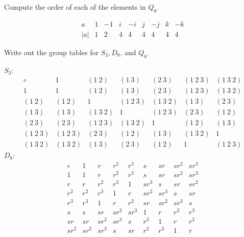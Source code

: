 \begin{problems}
    \item Compute the order of each of the elements in $Q_8$.
    \begin{sol}
        \[\begin{array}{c|c|c|c|c|c|c|c|c}
            a & 1 & -1 & i & -i & j & -j & k & -k \\
            \hline
            |a| & 1 & 2 & 4 & 4 & 4 & 4 & 4 & 4
        \end{array}\]
    \end{sol}
    \item Write out the group tables for $S_3, D_8$, and $Q_8$.
    \begin{sol}
        $S_3$:
        \[\begin{array}{c|c|c|c|c|c|c}
            \circ & 1 & (1\ 2) & (1\ 3) & (2\ 3) & (1\ 2\ 3) & (1\ 3\ 2) \\
            \hline
            1 & 1 & (1\ 2) & (1\ 3) & (2\ 3) & (1\ 2\ 3) & (1\ 3\ 2) \\
            (1\ 2) & (1\ 2) & 1 & (1\ 2\ 3) & (1\ 3\ 2) & (1\ 3) & (2\ 3) \\
            (1\ 3) & (1\ 3) & (1\ 3\ 2) & 1 & (1\ 2\ 3) & (2\ 3) & (1\ 2) \\
            (2\ 3) & (2\ 3) & (1\ 2\ 3) & (1\ 3\ 2) & 1 & (1\ 2) & (1\ 3) \\ 
            (1\ 2\ 3) & (1\ 2\ 3) & (2\ 3) & (1\ 2) & (1\ 3) & (1\ 3\ 2) & 1 \\
            (1\ 3\ 2) & (1\ 3\ 2) & (1\ 3) & (2\ 3) & (1\ 2) & 1 & (1\ 2\ 3)
        \end{array}\]
        $D_8$:
        \[\begin{array}{c|c|c|c|c|c|c|c|c}
            \circ & 1 & r & r^2 & r^3 & s & sr & sr^2 & sr^3 \\
            \hline
            1 & 1 & r & r^2 & r^3 & s & sr & sr^2 & sr^3 \\
            r & r & r^2 & r^3 & 1 & sr^3 & s & sr & sr^2 \\
            r^2 & r^2 & r^3 & 1 & r & sr^2 & sr^3 & s & sr \\
            r^3 & r^3 & 1 & r & r^2 & sr & sr^2 & sr^3 & s \\
            s & s & sr & sr^2 & sr^3 & 1 & r & r^2 & r^3 \\
            sr & sr & sr^2 & sr^3 & s & r^3 & 1 & r & r^2 \\
            sr^2 & sr^2 & sr^3 & s & sr & r^2 & r^3 & 1 & r \\

\end{array}\]
\end{sol}
\end{problems}
